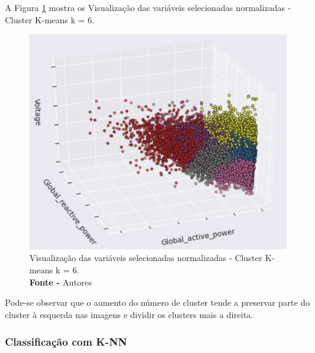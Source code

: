 A Figura \ref{fig: Visualização das variáveis selecionadas normalizadas - Cluster K-means k = 6} mostra os Visualização das variáveis selecionadas normalizadas - Cluster K-means k = 6.
\begin{figure}[H]
    \centering
    \includegraphics[width=0.99\textwidth]{Figuras/4. Resultados e Discussões/Exer4/Visualização das variáveis selecionadas normalizadas - Cluster K-means k = 6.jpg}
    \caption{Visualização das variáveis selecionadas normalizadas - Cluster K-means k = 6.\\ \textbf{Fonte -} Autores}
    \label{fig: Visualização das variáveis selecionadas normalizadas - Cluster K-means k = 6}
\end{figure}



 
 
 
 

Pode-se observar que o aumento do número de cluster tende a preservar parte do cluster à esquerda nas imagens e dividir os clusters mais a direita.

\subsubsection{Classificação com K-NN}

